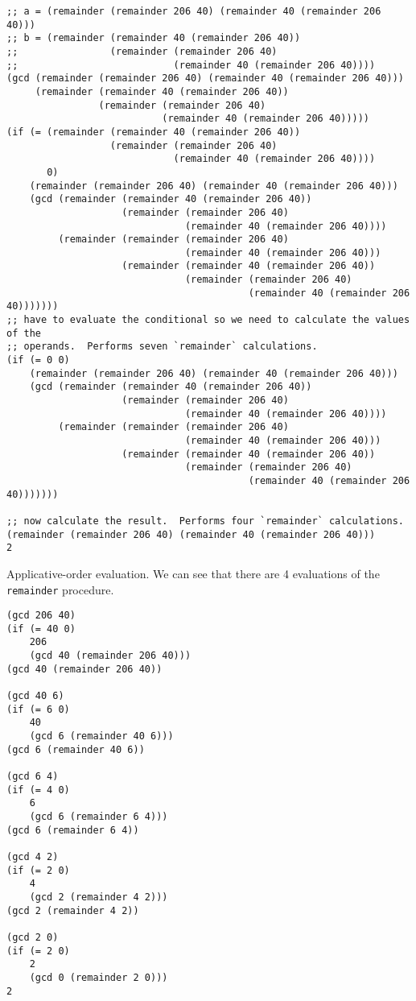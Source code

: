 \documentclass{article}
\begin{document}
\begin{lstlisting}[style=scheme]
;; a = (remainder (remainder 206 40) (remainder 40 (remainder 206 40)))
;; b = (remainder (remainder 40 (remainder 206 40))
;;                (remainder (remainder 206 40)
;;                           (remainder 40 (remainder 206 40))))
(gcd (remainder (remainder 206 40) (remainder 40 (remainder 206 40)))
     (remainder (remainder 40 (remainder 206 40))
                (remainder (remainder 206 40)
                           (remainder 40 (remainder 206 40)))))
(if (= (remainder (remainder 40 (remainder 206 40))
                  (remainder (remainder 206 40)
                             (remainder 40 (remainder 206 40))))
       0)
    (remainder (remainder 206 40) (remainder 40 (remainder 206 40)))
    (gcd (remainder (remainder 40 (remainder 206 40))
                    (remainder (remainder 206 40)
                               (remainder 40 (remainder 206 40))))
         (remainder (remainder (remainder 206 40)
                               (remainder 40 (remainder 206 40)))
                    (remainder (remainder 40 (remainder 206 40))
                               (remainder (remainder 206 40)
                                          (remainder 40 (remainder 206 40)))))))
;; have to evaluate the conditional so we need to calculate the values of the
;; operands.  Performs seven `remainder` calculations.
(if (= 0 0)
    (remainder (remainder 206 40) (remainder 40 (remainder 206 40)))
    (gcd (remainder (remainder 40 (remainder 206 40))
                    (remainder (remainder 206 40)
                               (remainder 40 (remainder 206 40))))
         (remainder (remainder (remainder 206 40)
                               (remainder 40 (remainder 206 40)))
                    (remainder (remainder 40 (remainder 206 40))
                               (remainder (remainder 206 40)
                                          (remainder 40 (remainder 206 40)))))))

;; now calculate the result.  Performs four `remainder` calculations.
(remainder (remainder 206 40) (remainder 40 (remainder 206 40)))
2
\end{lstlisting}





\noindent Applicative-order evaluation.  We can see that there are 4 evaluations
of the \lstinline{remainder} procedure.
\begin{lstlisting}[style=scheme]
(gcd 206 40)
(if (= 40 0)
    206
    (gcd 40 (remainder 206 40)))
(gcd 40 (remainder 206 40))

(gcd 40 6)
(if (= 6 0)
    40
    (gcd 6 (remainder 40 6)))
(gcd 6 (remainder 40 6))

(gcd 6 4)
(if (= 4 0)
    6
    (gcd 6 (remainder 6 4)))
(gcd 6 (remainder 6 4))

(gcd 4 2)
(if (= 2 0)
    4
    (gcd 2 (remainder 4 2)))
(gcd 2 (remainder 4 2))

(gcd 2 0)
(if (= 2 0)
    2
    (gcd 0 (remainder 2 0)))
2
\end{lstlisting}
\end{document}
